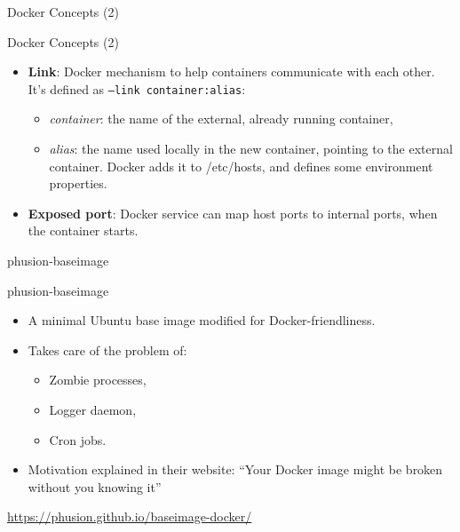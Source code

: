 \documentclass[presentation]{beamer}
\begin{document}
{
\begin{frame}[label=sec-4-4]{Docker Concepts (2)}

\begin{block}{Docker Concepts (2)}

\begin{itemize}
\item \textbf{Link}: Docker mechanism to help containers communicate with each other. It's defined as \texttt{--link container:alias}:
\begin{itemize}
\item \textit{container}: the name of the external, already running container,
\item \textit{alias}: the name used locally in the new container, pointing to the external container. Docker adds it to /etc/hosts, and defines some environment properties.
\end{itemize}
\item \textbf{Exposed port}: Docker service can map host ports to internal ports, when the container starts.
\end{itemize}
\end{block}
\end{frame}} %

{
\begin{frame}[label=sec-4-5]{phusion-baseimage}

\begin{block}{phusion-baseimage}

\begin{itemize}
\item A minimal Ubuntu base image modified for Docker-friendliness.
\item Takes care of the problem of:
\begin{itemize}
\item Zombie processes,
\item Logger daemon,
\item Cron jobs.
\end{itemize}
\item Motivation explained in their website: ``Your Docker image might be broken without you knowing it''
\end{itemize}
\url{https://phusion.github.io/baseimage-docker/}
\end{block}
\end{frame}} %
\end{document}
